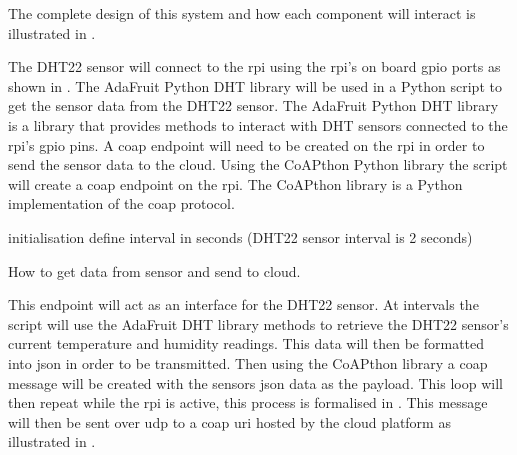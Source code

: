 The complete design of this system and how each component will interact
is illustrated in .

The DHT22 sensor will connect to the \gls{rpi} using the \gls{rpi}'s on board 
\gls{gpio} ports as shown in . 
The AdaFruit Python DHT library will be used in a Python script to get the 
sensor data from the DHT22 sensor.
The AdaFruit Python DHT library is a library that provides methods to interact 
with DHT sensors connected to the \gls{rpi}'s \gls{gpio} pins.
A \gls{coap} endpoint will need to be created on the \gls{rpi} in order to 
send the sensor data to the cloud. 
Using the CoAPthon Python library the script will create a \gls{coap} 
endpoint on the \gls{rpi}.
The CoAPthon library is a Python implementation of the \gls{coap} protocol.

\begin{center}
    \begin{algorithm}[htbp]
        initialisation\;
        define interval in seconds (DHT22 sensor interval is 2 seconds)\;
        \caption{\label{alg:get_send_data_alg}How to get data from sensor and send to cloud.}
    \end{algorithm}
\end{center}

This endpoint will act as an interface for the DHT22 sensor. 
At intervals the script will use the AdaFruit DHT library \citep{adafruit_adafruit_python_dht_2018} methods to retrieve 
the DHT22 sensor's current temperature and humidity readings. 
This data will then be formatted into \gls{json}
in order to be transmitted.
Then using the CoAPthon \citep{tanganelli_coapthon:_2015, tanganelli_coapthon3_2018} library a \gls{coap} 
message will be created with the sensors \gls{json} data as the payload. 
This loop will then repeat while the \gls{rpi} is active, this process is 
formalised in .
This message will then be sent over \gls{udp} to a \gls{coap} \gls{uri} 
hosted by the cloud platform as illustrated in .

